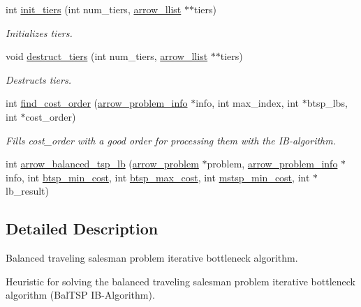 \begin{CompactItemize}
int \hyperlink{lib_2baltsp_2baltsp-lb_8c_05a2ff158dd6edc613a6623787c04a31}{init\_\-tiers} (int num\_\-tiers, \hyperlink{structarrow__llist}{arrow\_\-llist} $\ast$$\ast$tiers)
\begin{CompactList}\small\item\em Initializes tiers. \item\end{CompactList}\item 
void \hyperlink{lib_2baltsp_2baltsp-lb_8c_086f8eb237774105f487040ef6ac62df}{destruct\_\-tiers} (int num\_\-tiers, \hyperlink{structarrow__llist}{arrow\_\-llist} $\ast$$\ast$tiers)
\begin{CompactList}\small\item\em Destructs tiers. \item\end{CompactList}\item 
int \hyperlink{lib_2baltsp_2baltsp-lb_8c_fe2b4359a26c49fe7602c86021b91ee7}{find\_\-cost\_\-order} (\hyperlink{structarrow__problem__info}{arrow\_\-problem\_\-info} $\ast$info, int max\_\-index, int $\ast$btsp\_\-lbs, int $\ast$cost\_\-order)
\begin{CompactList}\small\item\em Fills cost\_\-order with a good order for processing them with the IB-algorithm. \item\end{CompactList}\item 
int \hyperlink{lib_2baltsp_2baltsp-lb_8c_a07f69e287f6e6242771ce651c1d65c2}{arrow\_\-balanced\_\-tsp\_\-lb} (\hyperlink{structarrow__problem}{arrow\_\-problem} $\ast$problem, \hyperlink{structarrow__problem__info}{arrow\_\-problem\_\-info} $\ast$info, int \hyperlink{bin_2baltsp-lb_8c_97987334c96a847ff74c2c6c83d78a73}{btsp\_\-min\_\-cost}, int \hyperlink{bin_2baltsp-lb_8c_8135b6557d64f65441d8f07fdc21ffdc}{btsp\_\-max\_\-cost}, int \hyperlink{bin_2baltsp-lb_8c_79e1b33b7d744b8baacfe9c0b2e73013}{mstsp\_\-min\_\-cost}, int $\ast$lb\_\-result)
\end{CompactItemize}


\subsection{Detailed Description}
Balanced traveling salesman problem iterative bottleneck algorithm. 

Heuristic for solving the balanced traveling salesman problem iterative bottleneck algorithm (BalTSP IB-Algorithm).

